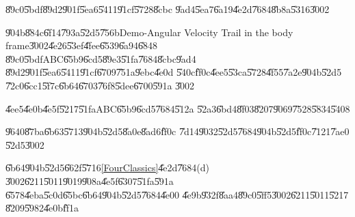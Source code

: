\begin{case}
\U{89c0}\U{5bdf}\U{89d2}\U{901f}\U{5ea6}\U{5411}\U{91cf}\U{5728}\U{8cbc}%
\U{9ad4}\U{5ea7}\U{6a19}\U{4e2d}\U{7684}\U{8b8a}\U{5316}\U{3002}
\end{case}

\U{904b}\U{884c}\U{6f14}\U{793a}\U{52d5}\U{756b}Demo-Angular Velocity Trail
in the body frame\U{3002}\U{4e26}\U{53ef}\U{4fee}\U{6539}\U{6a94}\U{6848}%
\U{89c0}\U{5bdf}ABC\U{65b9}\U{6cd5}\U{89e3}\U{51fa}\U{7684}\U{8cbc}\U{9ad4}%
\U{89d2}\U{901f}\U{5ea6}\U{5411}\U{91cf}\U{6709}\U{751a}\U{9ebc}\U{4e0d}%
\U{540c}\U{ff0c}\U{4ee5}\U{53ca}\U{5728}\U{4f55}\U{7a2e}\U{904b}\U{52d5}%
\U{72c0}\U{6cc1}\U{5f7c}\U{6b64}\U{6703}\U{76f8}\U{5dee}\U{6700}\U{591a}%
\U{3002}

\begin{case}
\U{4ee5}\U{4e0b}\U{4e5f}\U{5217}\U{51fa}ABC\U{65b9}\U{6cd5}\U{7684}\U{512a}%
\U{52a3}\U{6bd4}\U{8f03}\U{8207}\U{9069}\U{7528}\U{5834}\U{5408}
\end{case}

%
\begin{center}

\end{center}%

\begin{case}
\U{9640}\U{87ba}\U{6b63}\U{5713}\U{904b}\U{52d5}\U{8a0e}\U{8ad6}\U{ff0c}%
\U{7d14}\U{9032}\U{52d5}\U{7684}\U{904b}\U{52d5}\U{ff0c}\U{7121}\U{7ae0}%
\U{52d5}\U{3002}
\end{case}

\U{6b64}\U{904b}\U{52d5}\U{662f}\U{5716}\ref{FourClassics}\U{4e2d}\U{7684}(d)%
\U{3002}\U{6211}\U{5011}\U{9019}\U{908a}\U{4e5f}\U{6307}\U{51fa}\U{591a}%
\U{6578}\U{4eba}\U{5c0d}\U{65bc}\U{6b64}\U{904b}\U{52d5}\U{7684}\U{4e00}%
\U{4e9b}\U{932f}\U{8aa4}\U{89c0}\U{5ff5}\U{3002}\U{6211}\U{5011}\U{5217}%
\U{8209}\U{5982}\U{4e0b}\U{ff1a}

